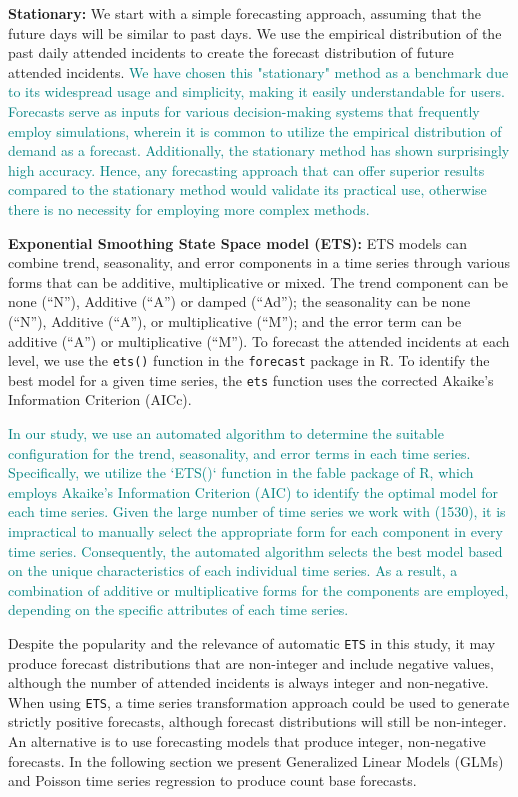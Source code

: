 \documentclass[
  authoryear,
  preprint,
  3p]{elsarticle}
\begin{document}
\textbf{Stationary:} We start with a simple forecasting approach,
assuming that the future days will be similar to past days. We use the
empirical distribution of the past daily attended incidents to create
the forecast distribution of future attended incidents.
\textcolor{teal}{We have chosen this "stationary" method as a benchmark due to its widespread usage and simplicity, making it easily understandable for users. Forecasts serve as inputs for various decision-making systems that frequently employ simulations, wherein it is common to utilize the empirical distribution of demand as a forecast. Additionally, the stationary method has shown surprisingly high accuracy. Hence, any forecasting approach that can offer superior results compared to the stationary method would validate its practical use, otherwise there is no necessity for employing more complex methods.}

\textbf{Exponential Smoothing State Space model (ETS):} ETS models
\citep{hyndman2021forecasting} can combine trend, seasonality, and error
components in a time series through various forms that can be additive,
multiplicative or mixed. The trend component can be none (``N''),
Additive (``A'') or damped (``Ad''); the seasonality can be none
(``N''), Additive (``A''), or multiplicative (``M''); and the error term
can be additive (``A'') or multiplicative (``M''). To forecast the
attended incidents at each level, we use the \texttt{ets()} function in
the \texttt{forecast} package \citep{Rforecast, HK08} in R. To identify
the best model for a given time series, the \texttt{ets} function uses
the corrected Akaike's Information Criterion (AICc).

\textcolor{teal}{In our study, we use an automated algorithm to determine the suitable configuration for the trend, seasonality, and error terms in each time series. Specifically, we utilize the `ETS()` function in the fable package of R, which employs Akaike's Information Criterion (AIC) to identify the optimal model for each time series. Given the large number of time series we work with (1530), it is impractical to manually select the appropriate form for each component in every time series. Consequently, the automated algorithm selects the best model based on the unique characteristics of each individual time series. As a result, a combination of additive or multiplicative forms for the components are employed, depending on the specific attributes of each time series.}

Despite the popularity and the relevance of automatic \texttt{ETS} in
this study, it may produce forecast distributions that are non-integer
and include negative values, although the number of attended incidents
is always integer and non-negative. When using \texttt{ETS}, a time
series transformation approach could be used to generate strictly
positive forecasts, although forecast distributions will still be
non-integer. An alternative is to use forecasting models that produce
integer, non-negative forecasts. In the following section we present
Generalized Linear Models (GLMs) and Poisson time series regression to
produce count base forecasts.
\end{document}
